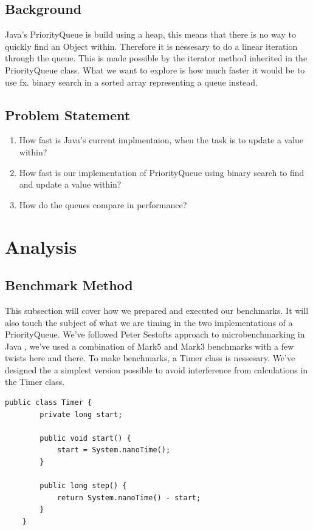 \documentclass{article}
\begin{document}
\subsection{Background}
Java's PriorityQueue is build using a heap, this means that there is no way to quickly find an Object within.
Therefore it is nessesary to do a linear iteration through the queue. This is made possible by 
the iterator method inherited in the PriorityQueue class. What we want to explore is how much faster it would 
be to use fx. binary search in a sorted array representing a queue instead.  
\subsection{Problem Statement}
\begin{enumerate}
    \item How fast is Java's current implmentaion, when the task is to update a value within?
    \item How fast is our implementation of PriorityQueue using binary search to find and update a value within?
    \item How do the queues compare in performance?
\end{enumerate}


\section{Analysis}
\subsection{Benchmark Method} %
This subsection will cover how we prepared and executed our benchmarks.
It will also touch the subject of what we are timing in the two implementations
of a PriorityQueue. We've followed Peter Sestofts approach to microbenchmarking in 
Java \cite{microbenchmarks}, we've used a combination of Mark5 and Mark3 
benchmarks with a few twists here and there. 
To make benchmarks, a Timer class is nessesary. We've designed the a simplest
version possible to avoid interference from calculations in the Timer class.

\begin{lstlisting}[caption={Simple Timer class implementation},label={lst:timerclass}]
    public class Timer {
        private long start;

        public void start() {
            start = System.nanoTime();
        }

        public long step() {
            return System.nanoTime() - start;
        }
    }
\end{lstlisting}
\end{document}

